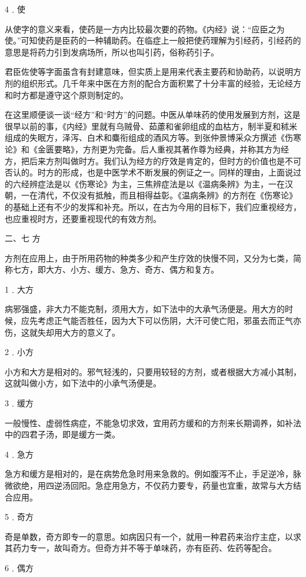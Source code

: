 \documentclass[a4paper,12pt,UTF8,twoside]{ctexbook}
\begin{document}
4﹒使

从使字的意义来看，使药是一方内比较最次要的药物。《内经》说：“应臣之为使。”可知使药是臣药的一种辅助药。在临症上一般把使药理解为引经药，引经药的意思是将药力引到发病场所，所以也叫引药，俗称药引子。

君臣佐使等字面虽含有封建意味，但实质上是用来代表主要药和协助药，以说明方剂的组织形式。几千年来中医在方剂的配合方面积累了十分丰富的经验，无论经方和时方都是遵守这个原则制定的。

在这里顺便谈一谈“经方”和“时方”的问题。中医从单味药的使用发展到方剂，这是很早以前的事，《内经》里就有乌贼骨、茹藘和雀卵组成的血枯方，制半夏和秫米组成的失眠方，泽泻、白术和麋衔组成的酒风方等。到张仲景博采众方撰述《伤寒论》和《金匮要略》，方剂更为完备。后人重视其著作尊为经典，并称其方为经方，把后来方剂叫做时方。我们认为经方的疗效是肯定的，但时方的价值也是不可否认的。时方的形成，也是中医学术不断发展的例证之一。同样的理由，上面说过的六经辨症法是以《伤寒论》为主，三焦辨症法是以《温病条辨》为主，一在汉朝，一在清代，不仅没有抵触，而且相得益彰。《温病条辨》的方剂在《伤寒论》的基础上还有不少的发挥和补充。所以，在古为今用的目标下，我们应重视经方，也应重视时方，还要重视现代的有效方剂。

二、七 方

方剂在应用上，由于所用药物的种类多少和产生疗效的快慢不同，又分为七类，简称七方，即大方、小方、缓方、急方、奇方、偶方和复方。

1﹒大方

病邪强盛，非大力不能克制，须用大方，如下法中的大承气汤便是。用大方的时候，应先考虑正气能否胜任，因为大下可以伤阴，大汗可使亡阳，邪虽去而正气亦伤，这就失却用大方的意义了。

2﹒小方

小方和大方是相对的。邪气轻浅的，只要用较轻的方剂，或者根据大方减小其制，这就叫做小方，如下法中的小承气汤便是。

3﹒缓方

一般慢性、虚弱性病症，不能急切求效，宜用药方缓和的方剂来长期调养，如补法中的四君子汤，即是缓方一类。

4﹒急方

急方和缓方是相对的，是在病势危急时用来急救的。例如腹泻不止，手足逆冷，脉微欲绝，用四逆汤回阳。急症用急方，不仅药力要专，药量也宜重，故常与大方结合应用。

5﹒奇方

奇是单数，奇方即专一的意思。如病因只有一个，就用一种君药来治疗主症，以求其药力专一，故叫奇方。但奇方并不等于单味药，亦有臣药、佐药等配合。

6﹒偶方
\end{document}
